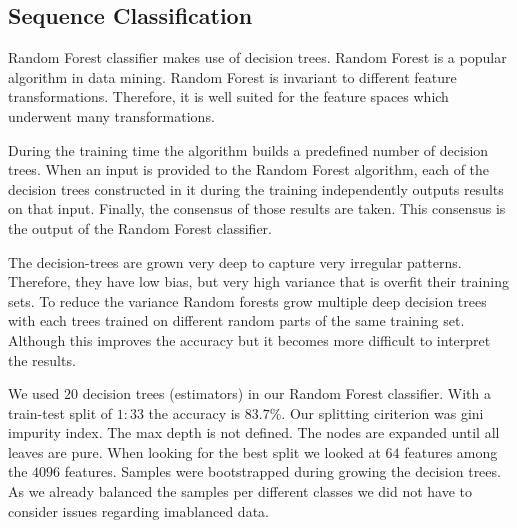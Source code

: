 \documentclass[oneside, twocolumn, a4paper, 10pt]{IEEEtran}
\begin{document}
\subsection{Sequence Classification}
Random Forest classifier makes use of decision trees. Random Forest is a popular algorithm in data mining. Random Forest is invariant to different feature transformations. Therefore, it is well suited for the feature spaces which underwent many transformations.\\
\par
During the training time the algorithm builds a predefined number of decision trees. When an input is provided to the Random Forest algorithm, each of the decision trees constructed in it during the training independently outputs results on that input. Finally, the consensus of those results are taken. This consensus is the output of the Random Forest classifier.\\
\par 
The decision-trees are grown very deep to capture very irregular patterns. Therefore, they have low bias, but very high variance that is overfit their training sets. To reduce the variance Random forests grow multiple deep decision trees with each trees trained on different random parts of the same training set. Although this improves the accuracy but it becomes more difficult to interpret the results.\\
\par 
We used $20$ decision trees (estimators) in our Random Forest classifier. With a train-test split of $1:33$ the accuracy is $83.7$\%. Our splitting ciriterion was gini impurity index. The max depth is not defined. The nodes are expanded until all leaves are pure. When looking for the best split we looked at $64$ features among the $4096$ features. Samples were bootstrapped during growing the decision trees. As we already balanced the samples per different classes we did not have to consider issues regarding imablanced data. 
\end{document}
